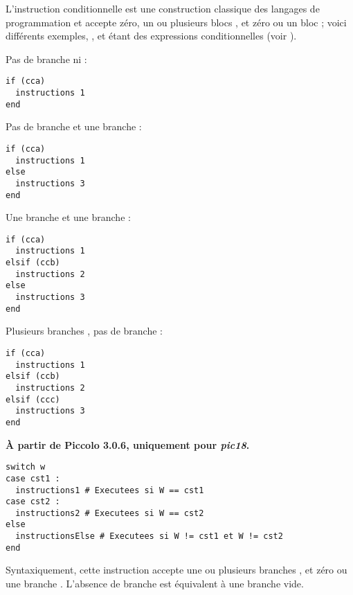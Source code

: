 L'instruction conditionnelle est une construction classique des langages de programmation et accepte zéro, un ou plusieurs blocs , et zéro ou un bloc  ; voici différents exemples, ,  et  étant des expressions conditionnelles (voir ).


Pas de branche  ni  :
\begin{lstlisting}[language=piccolo]
if (cca)
  instructions 1
end
\end{lstlisting}

Pas de branche  et une branche  :
\begin{lstlisting}[language=piccolo]
if (cca)
  instructions 1
else
  instructions 3
end
\end{lstlisting}

Une branche  et une branche  :
\begin{lstlisting}[language=piccolo]
if (cca)
  instructions 1
elsif (ccb)
  instructions 2
else
  instructions 3
end
\end{lstlisting}

Plusieurs branches , pas de branche  :
\begin{lstlisting}[language=piccolo]
if (cca)
  instructions 1
elsif (ccb)
  instructions 2
elsif (ccc)
  instructions 3
end
\end{lstlisting}






\textbf{À partir de Piccolo 3.0.6, uniquement pour \emph{pic18}.}


\begin{lstlisting}[language=piccolo]
switch w
case cst1 :
  instructions1 # Executees si W == cst1
case cst2 :
  instructions2 # Executees si W == cst2
else
  instructionsElse # Executees si W != cst1 et W != cst2
end
\end{lstlisting}

Syntaxiquement, cette instruction accepte une ou plusieurs branches , et zéro ou une branche . L'absence de branche  est équivalent à une branche  vide.

